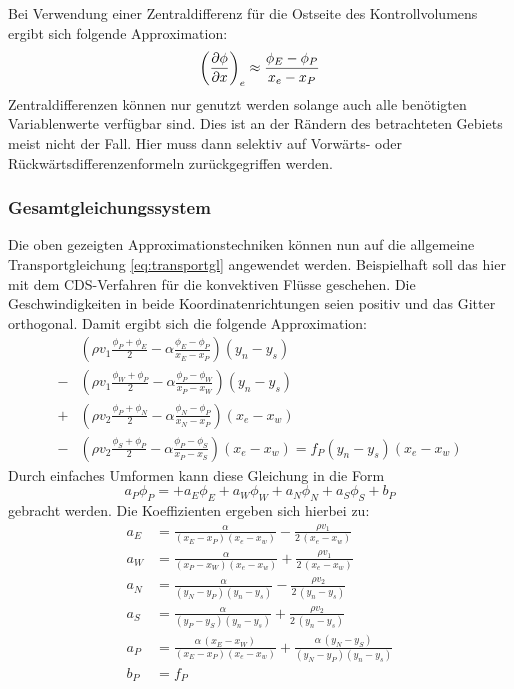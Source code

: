 Bei Verwendung einer Zentraldifferenz für die Ostseite des Kontrollvolumens ergibt sich folgende
Approximation:
\begin{equation}
  \left({\pder[\phi]{x}}\right)_e \approx \frac{\phi_E -\phi_P}{x_e-x_P}
\end{equation}
Zentraldifferenzen können nur genutzt werden solange auch alle benötigten Variablenwerte
verfügbar sind. Dies ist an der Rändern des betrachteten Gebiets meist nicht der Fall.
Hier muss dann selektiv auf Vorwärts- oder Rückwärtsdifferenzenformeln zurückgegriffen werden.


\subsubsection{Gesamtgleichungssystem}

Die oben gezeigten Approximationstechniken können nun auf die allgemeine Transportgleichung
\eqref{eq:transportgl} angewendet werden. Beispielhaft soll das hier mit dem CDS-Verfahren für
die konvektiven Flüsse geschehen. Die Geschwindigkeiten in beide Koordinatenrichtungen seien positiv
und das Gitter orthogonal. Damit ergibt sich die folgende Approximation:
\begin{align*}
  &\left({\rho v_1 \frac{\phi_P+\phi_E}{2} - \alpha \frac{\phi_E-\phi_P}{x_E-x_P}}\right) (y_n-y_s)\\
  -&\left({\rho v_1 \frac{\phi_W+\phi_P}{2} - \alpha \frac{\phi_P-\phi_W}{x_P-x_W}}\right) (y_n-y_s)\\
  +&\left({\rho v_2 \frac{\phi_P+\phi_N}{2} - \alpha \frac{\phi_N-\phi_P}{x_N-x_P}}\right) (x_e-x_w)\\
  -&\left({\rho v_2 \frac{\phi_S+\phi_P}{2} - \alpha \frac{\phi_P-\phi_S}{x_P-x_S}}\right) (x_e-x_w)=
  f_P (y_n-y_s)(x_e-x_w)
\end{align*}
Durch einfaches Umformen kann diese Gleichung in die Form
\begin{equation}
  a_P\phi_P = + a_E\phi_E + a_W\phi_W + a_N\phi_N + a_S\phi_S + b_P
  \label{eq:fvm_kv}
\end{equation}
gebracht werden.
Die Koeffizienten ergeben sich hierbei zu:
\begin{align*}
  a_E &= \frac{\alpha}{(x_E-x_P)(x_e-x_w)} - \frac{\rho v_1}{2\,(x_e-x_w)}\\
  a_W &= \frac{\alpha}{(x_P-x_W)(x_e-x_w)} + \frac{\rho v_1}{2\,(x_e-x_w)}\\
  a_N &= \frac{\alpha}{(y_N-y_P)(y_n-y_s)} - \frac{\rho v_2}{2\,(y_n-y_s)}\\
  a_S &= \frac{\alpha}{(y_P-y_S)(y_n-y_s)} + \frac{\rho v_2}{2\,(y_n-y_s)}\\
  a_P &= \frac{\alpha\, (x_E-x_W)}{(x_E-x_P)(x_e-x_w)} + \frac{\alpha\, (y_N-y_S)}{(y_N-y_P)(y_n-y_s)}\\
  b_P &= f_P
\end{align*}
